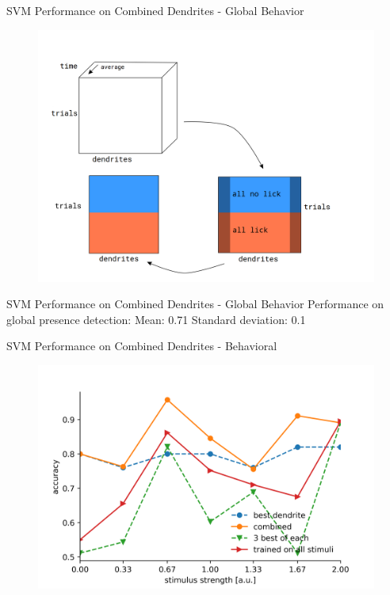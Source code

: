 \documentclass[10pt]{beamer}
\begin{document}
\begin{frame}[fragile]{SVM Performance on Combined Dendrites - Global Behavior}
\begin{center}
	\begin{figure}
      \includegraphics[width=1.0\textwidth]{data_hm_tot.png}
	\end{figure}
	\end{center}
\end{frame}

\begin{frame}[fragile]{SVM Performance on Combined Dendrites - Global Behavior}
Performance on global presence detection: \newline
Mean: 0.71 \newline
Standard deviation: 0.1
\end{frame}

\begin{frame}[fragile]{SVM Performance on Combined Dendrites - Behavioral}
\begin{center}
	\begin{figure}
      \includegraphics[width=1.0\textwidth]{combined_hitmiss_alt.png}
	\end{figure}
	\end{center}
\end{frame}
\end{document}
